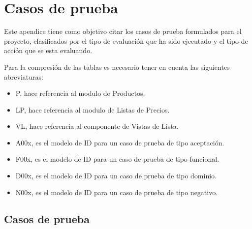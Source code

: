 \chapter{Casos de prueba}\label{appendix_testscases}
Este apendice tiene como objetivo citar los casos de prueba formulados para el
proyecto, clasificados por el tipo de evaluación que ha sido ejecutado y el tipo
de acción que se esta evaluando.

Para la compresión de las tablas es necesario tener en cuenta las siguientes
abreviaturas:

\begin{itemize}
    \item P, hace referencia al modulo de Productos.
    \item LP, hace referencia al modulo de Listas de Precios.
    \item VL, hace referencia al componente de Vistas de Lista.
    \item A00x, es el modelo de ID para un caso de prueba de tipo aceptación.
    \item F00x, es el modelo de ID para un caso de prueba de tipo funcional.
    \item D00x, es el modelo de ID para un caso de prueba de tipo dominio.
    \item N00x, es el modelo de ID para un caso de prueba de tipo negativo.
\end{itemize}

\section{Casos de prueba}

